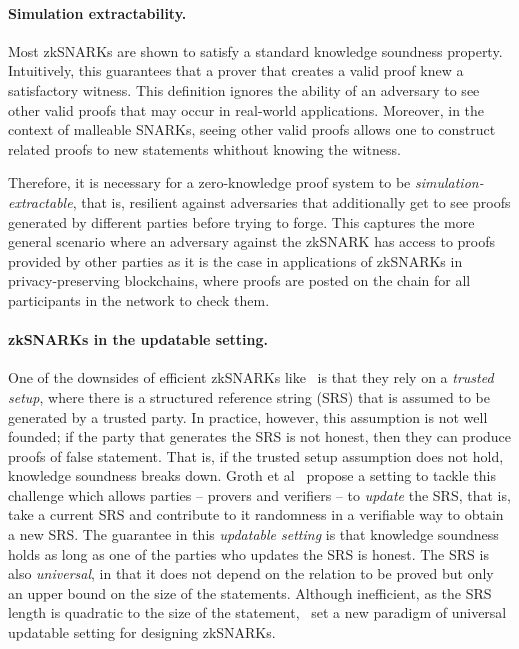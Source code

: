 \paragraph{Simulation extractability.}
Most zkSNARKs are shown to satisfy a standard knowledge soundness property. 
Intuitively, this guarantees that
a prover that creates a valid proof knew a satisfactory witness.  
This definition ignores the ability of an adversary to see other valid proofs that may occur in real-world applications. 
Moreover, in the context of malleable SNARKs, seeing other valid proofs allows one to construct related proofs to new statements whithout knowing the witness. 

Therefore, it is necessary for a zero-knowledge proof system to be \emph{simulation-extractable}, that is, resilient against adversaries that additionally get to see proofs generated by different parties before trying to forge.
This captures the more general scenario where an adversary against the zkSNARK has access to proofs provided by other parties as it is the case in applications of
zkSNARKs in privacy-preserving blockchains,  where proofs are posted on the chain for all
participants in the network to check them. 

\paragraph{zkSNARKs in the updatable setting.}
One of the downsides of efficient zkSNARKs like~\cite{AC:Groth10a,TCC:Lipmaa12,EC:GGPR13,SP:PHGR13,AC:Lipmaa13,AC:DFGK14,EC:Groth16} is that they rely on a \textit{trusted setup}, where there is a structured reference string (SRS) that is assumed to be generated by a trusted party. In practice, however, this assumption is not well founded; if the party that generates the SRS is not honest, then they can produce proofs of false statement. That is, if the trusted setup assumption does not hold, knowledge soundness breaks down.
Groth et al~\cite{C:GKMMM18} propose a setting to tackle this challenge which allows parties -- provers and verifiers -- to \emph{update} the SRS, that is, take a current SRS and contribute to it randomness in a verifiable way to obtain a new SRS. The guarantee in this \textit{updatable setting} is that knowledge soundness holds as long as one of the parties who updates the SRS is honest. The SRS is also \emph{universal}, in that it does not depend on the relation to be proved but only an upper bound on the size of the statements.
Although inefficient, as the SRS length is quadratic to the size of the statement,~\cite{C:GKMMM18} set a new
paradigm of universal updatable setting for designing zkSNARKs.

